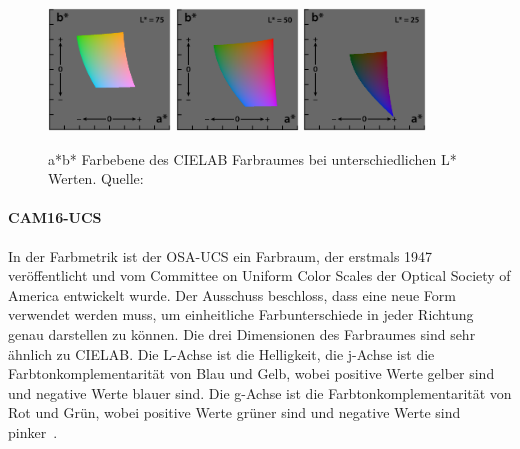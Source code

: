 \documentclass[12pt, a4paper, ngerman]{article}
\begin{document}
\begin{figure}
  \centering
  \includegraphics[width=0.29\textwidth]{Grafiken/CIELAB1.png}
  \includegraphics[width=0.29\textwidth]{Grafiken/CIELAB2.png}
  \includegraphics[width=0.29\textwidth]{Grafiken/CIELAB3.png}
  \caption{a*b* Farbebene des CIELAB Farbraumes bei unterschiedlichen L* Werten. Quelle:~\cite{CIELAB_color_space_2023}}
  \label{fig:CIELAB}
\end{figure}

\paragraph{CAM16-UCS}
In der Farbmetrik ist der \ac{OSA-UCS} ein Farbraum, 
der erstmals 1947 veröffentlicht und vom Committee on Uniform Color Scales der Optical Society of America entwickelt wurde.
Der Ausschuss beschloss, dass eine neue Form verwendet werden muss, 
um einheitliche Farbunterschiede in jeder Richtung genau darstellen zu können.
Die drei Dimensionen des Farbraumes sind sehr ähnlich zu CIELAB.
Die L-Achse ist die Helligkeit, die j-Achse ist die Farbtonkomplementarität von Blau und Gelb, 
wobei positive Werte gelber sind und negative Werte blauer sind.
Die g-Achse ist die Farbtonkomplementarität von Rot und Grün, 
wobei positive Werte grüner sind und negative Werte sind pinker~\cite{OSA-UCS_2023}.
\end{document}
